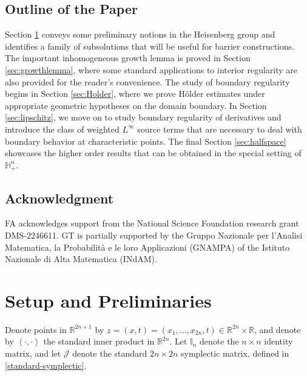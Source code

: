 \documentclass[12pt]{amsart}
\newcommand{\R}{{\mathbb R}}
\newcommand{\J}{\mathcal{J}}
\newcommand{\la}{\left\langle}
\newcommand{\ra}{\right\rangle}
\def \H {{\mathbb H}}
\def \la {\left\langle }
\def \ra {\right\rangle}
\begin{document}
\subsection{Outline of the Paper} Section \ref{sec:preliminaries} conveys some preliminary notions in the Heisenberg group and identifies a family of subsolutions that will be useful for barrier constructions. The important inhomogeneous growth lemma is proved in Section \ref{sec:growthlemma}, where some standard applications to interior regularity are also provided for the reader's convenience. The study of boundary regularity begins in Section \ref{sec:Holder}, where we prove H\"older estimates under appropriate geometric hypotheses on the domain boundary. In Section \ref{sec:lipschitz}, we move on to study boundary regularity of derivatives and introduce the class of weighted $L^{\infty}$ source terms that are necessary to deal with boundary behavior at characteristic points. The final Section \ref{sec:halfspace} showcases the higher order results that can be obtained in the special setting of $\H^n_+$.

\subsection*{Acknowledgment} FA acknowledges support from the National Science Foundation research grant DMS-2246611. GT is partially supported by the Gruppo Nazionale per l’Analisi Matematica, la Probabilità e le loro Applicazioni (GNAMPA) of the Istituto Nazionale di Alta Matematica (INdAM).


\section{Setup and Preliminaries}\label{sec:preliminaries}


Denote points in $\R^{2n+1}$ by $z = (x,t) = (x_1,\ldots, x_{2n}, t) \in \R^{2n} \times \R$, and denote by $\la \cdot, \cdot \ra$ the standard inner product in $\R^{2n}$. Let $\mathbb{I}_n$ denote the $n \times n$ identity matrix, and let $\J$ denote the standard $2n \times 2n$ symplectic matrix, defined in \eqref{standard-symplectic}.
\end{document}
